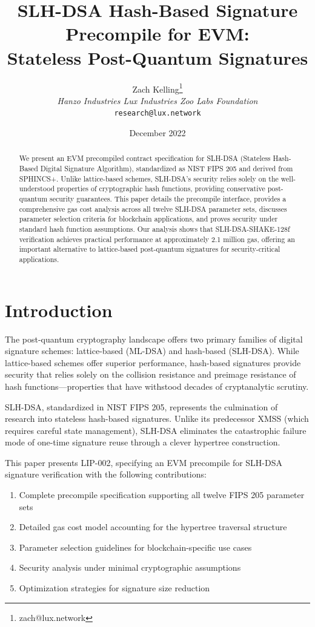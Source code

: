 \documentclass[11pt,a4paper]{article}
\title{SLH-DSA Hash-Based Signature Precompile for EVM:\\Stateless Post-Quantum Signatures}
\author{Zach Kelling\thanks{zach@lux.network} \\ \textit{Hanzo Industries \quad Lux Industries \quad Zoo Labs Foundation} \\ \texttt{research@lux.network}}
\date{December 2022}
\begin{document}
\maketitle

\begin{abstract}
We present an EVM precompiled contract specification for SLH-DSA (Stateless Hash-Based Digital Signature Algorithm), standardized as NIST FIPS 205 and derived from SPHINCS+. Unlike lattice-based schemes, SLH-DSA's security relies solely on the well-understood properties of cryptographic hash functions, providing conservative post-quantum security guarantees. This paper details the precompile interface, provides a comprehensive gas cost analysis across all twelve SLH-DSA parameter sets, discusses parameter selection criteria for blockchain applications, and proves security under standard hash function assumptions. Our analysis shows that SLH-DSA-SHAKE-128f verification achieves practical performance at approximately 2.1 million gas, offering an important alternative to lattice-based post-quantum signatures for security-critical applications.
\end{abstract}

\section{Introduction}

The post-quantum cryptography landscape offers two primary families of digital signature schemes: lattice-based (ML-DSA) and hash-based (SLH-DSA). While lattice-based schemes offer superior performance, hash-based signatures provide security that relies solely on the collision resistance and preimage resistance of hash functions---properties that have withstood decades of cryptanalytic scrutiny.

SLH-DSA, standardized in NIST FIPS 205, represents the culmination of research into stateless hash-based signatures. Unlike its predecessor XMSS (which requires careful state management), SLH-DSA eliminates the catastrophic failure mode of one-time signature reuse through a clever hypertree construction.

This paper presents LIP-002, specifying an EVM precompile for SLH-DSA signature verification with the following contributions:

\begin{enumerate}
    \item Complete precompile specification supporting all twelve FIPS 205 parameter sets
    \item Detailed gas cost model accounting for the hypertree traversal structure
    \item Parameter selection guidelines for blockchain-specific use cases
    \item Security analysis under minimal cryptographic assumptions
    \item Optimization strategies for signature size reduction
\end{enumerate}
\end{document}
